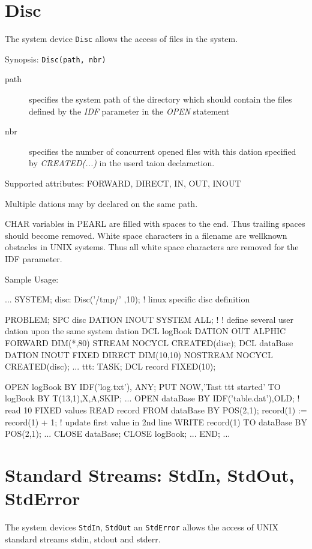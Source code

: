 \section{Disc}
The system device \verb|Disc| allows the access of files in the system.

Synopsis: \verb|Disc(path, nbr)|

\begin{description}
\item [path] specifies the system path of the directory which should contain
    the files defined by the {\em IDF} parameter in the {\em OPEN} statement
\item[nbr] specifies the number of concurrent opened files with this dation
     specified by {\em CREATED(...)} in the userd taion declaraction.
\end{description}

Supported attributes: FORWARD, DIRECT, IN, OUT, INOUT

Multiple dations may by declared on the same path.

CHAR variables in PEARL are filled with spaces to the end.
Thus trailing spaces should become removed.
White space characters in a filename are wellknown obstacles in UNIX 
systems. Thus all white space characters are removed for the IDF parameter.


Sample Usage:
\begin{PEARLCode}
...
SYSTEM;
   disc: Disc('/tmp/' ,10); ! linux specific disc definition

PROBLEM;
   SPC disc DATION INOUT SYSTEM ALL;
   !
   ! define several user dation upon the same system dation
   DCL logBook DATION OUT ALPHIC FORWARD DIM(*,80)
                      STREAM NOCYCL CREATED(disc);
   DCL dataBase DATION INOUT FIXED DIRECT DIM(10,10) 
                      NOSTREAM NOCYCL CREATED(disc);
...
ttt: TASK;
   DCL record FIXED(10);

   OPEN logBook BY IDF('log.txt'), ANY;
   PUT NOW,'Tast ttt started' TO logBook BY T(13,1),X,A,SKIP;
...
   OPEN dataBase BY IDF('table.dat'),OLD;
   ! read 10 FIXED values
   READ record FROM dataBase BY POS(2,1);
   record(1) := record(1) + 1;
   ! update first value in 2nd line
   WRITE record(1) TO dataBase BY POS(2,1);
...
   CLOSE dataBase;
   CLOSE logBook;
...
END;
...
\end{PEARLCode}

\section{Standard Streams: StdIn, StdOut, StdError}
The system devices \verb|StdIn|,
\verb|StdOut| an \verb|StdError| allows the access of UNIX standard streams
stdin, stdout and stderr.

